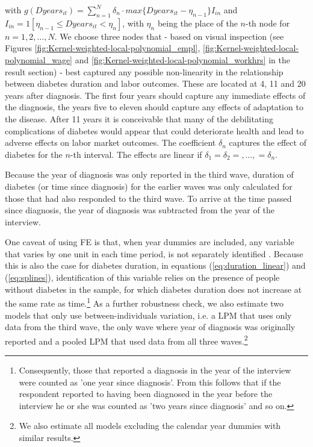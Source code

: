 \documentclass[12pt,english]{article}
\begin{document}
{\noindent with $g(Dyears_{it})=\sum_{n=1}^{N}\delta_{n}\cdot max\{Dyears_{it}-\eta_{n-1}\}I_{in}$ and $I_{in}=1[\eta_{n-1}\leq Dyears_{it}<\eta_{n}]$, with $\eta_{n}$ being the place of the $n$-th node for $n=1,2,\ldots,N$. We choose three nodes that - based on visual inspection (see Figures \ref{fig:Kernel-weighted-local-polynomial_empl}, \ref{fig:Kernel-weighted-local-polynomial_wage} and \ref{fig:Kernel-weighted-local-polynomial_workhrs} in the result section) - best captured any possible non-linearity in the
relationship between diabetes duration and labor outcomes. These are located at 4, 11 and 20 years after diagnosis. The
first four years should capture any immediate effects of the diagnosis, the years five to eleven should capture any effects of adaptation to the disease. After 11 years it is conceivable that many of the debilitating complications of diabetes would appear that could deteriorate health and lead to adverse effects on labor market outcomes. The coefficient $\delta_{n}$ captures the effect of diabetes for the $n$-th interval. The effects are linear if $\delta_{1}=\delta_{2}=,\ldots,=\delta_{n}$.

Because the year of diagnosis was only reported in the third wave, duration of diabetes (or time since diagnosis) for the earlier waves was only calculated for those that had also responded to the third wave. To arrive at the time passed since diagnosis, the year of diagnosis was subtracted from the year of the interview.

One caveat of using \ac{FE} is that, when year dummies are included, any variable that varies by one unit in each time period, is not separately identified \parencite{Wooldridge2012}. Because this is also the case for diabetes duration, in equations (\ref{eq:duration_linear}) and (\ref{eq:splines}), identification of this variable relies on the presence of people without diabetes in the sample, for which diabetes duration does not increase at the same rate as time.\footnote{Consequently, those that reported a diagnosis in the year of the interview were counted as 'one year since diagnosis'. From this follows that if the respondent reported to having been diagnosed in the year before the interview he or she was counted as 'two years since diagnosis' and so on.} As a further robustness check, we also estimate two models that only use between-individuals variation, i.e. a \ac{LPM} that uses only data from the third wave, the only wave where year of diagnosis was originally reported and a pooled \ac{LPM} that used data from all three waves.\footnote{We also estimate all models excluding the calendar year dummies with similar results.}



}
\end{document}
